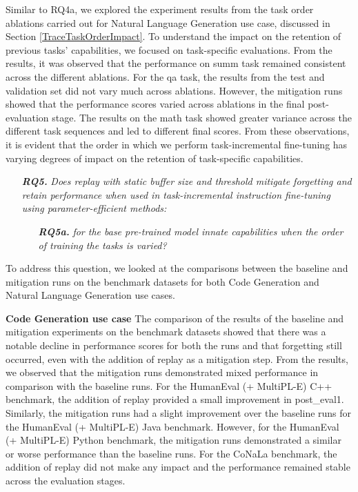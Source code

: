 Similar to RQ4a, we explored the experiment results from the task order ablations carried out for Natural Language Generation use case, discussed in Section \ref{TraceTaskOrderImpact}. To understand the impact on the retention of previous tasks’ capabilities, we focused on task-specific evaluations. From the results, it was observed that the performance on summ task remained consistent across the different ablations. For the qa task, the results from the test and validation set did not vary much across ablations. However, the mitigation runs showed that the performance scores varied across ablations in the final post-evaluation stage. The results on the math task showed greater variance across the different task sequences and led to different final scores. From these observations, it is evident that the order in which we perform task-incremental fine-tuning has varying degrees of impact on the retention of task-specific capabilities. 

\newcommand{\RQfive}{Does replay with static buffer size and threshold mitigate forgetting and retain performance when used in task-incremental instruction fine-tuning using parameter-efficient methods:}
\newcommand{\RQfivea}{for the base pre-trained model innate capabilities when the order of training the tasks is varied?}

\begin{enumerate}
    \item[\textit{\textbf{RQ5.}}] \textit{\RQfive}
    \begin{enumerate}
        \item[\textit{\textbf{RQ5a.}}] \textit{\RQfivea}
    \end{enumerate}
\end{enumerate}

To address this question, we looked at the comparisons between the baseline and mitigation runs on the benchmark datasets for both Code Generation and Natural Language Generation use cases. 

\textbf{Code Generation use case}
The comparison of the results of the baseline and mitigation experiments on the benchmark datasets showed that there was a notable decline in performance scores for both the runs and that forgetting still occurred, even with the addition of replay as a mitigation step. From the results, we observed that the mitigation runs demonstrated mixed performance in comparison with the baseline runs. For the HumanEval (+ MultiPL-E) C++ benchmark, the addition of replay provided a small improvement in post\_eval1. Similarly, the mitigation runs had a slight improvement over the baseline runs for the HumanEval (+ MultiPL-E) Java benchmark. However, for the HumanEval (+ MultiPL-E) Python benchmark, the mitigation runs demonstrated a similar or worse performance than the baseline runs. For the CoNaLa benchmark, the addition of replay did not make any impact and the performance remained stable across the evaluation stages.

